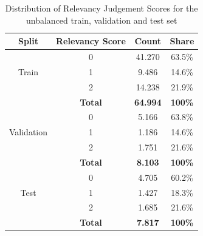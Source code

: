 \documentclass[sigconf, natbib=true]{acmart}
\begin{document}
\begin{table}[]
\caption{Distribution of Relevancy Judgement Scores for the unbalanced train, validation and test set}
\label{tab:train_val_test_spilt}
\begin{tabular}{c c c c}
\hline
\textbf{Split}                       & \textbf{Relevancy Score} & \textbf{Count} & \textbf{Share} \\ \hline
\multirow{3}{*}{Train}      & 0               & 41.270 & 63.5\%  \\ \cline{2-4} 
                            & 1               & 9.486  & 14.6\%  \\ \cline{2-4} 
                            & 2               & 14.238 & 21.9\%  \\ \cline{2-4} 
                       & \textbf{Total}               & \textbf{64.994} & \textbf{100\%}   \\ \hline
\multirow{3}{*}{Validation} & 0               & 5.166  & 63.8\%  \\ \cline{2-4} 
                            & 1               & 1.186  & 14.6\%  \\ \cline{2-4} 
                            & 2               & 1.751  & 21.6\%  \\ \cline{2-4} 
                       & \textbf{Total}               & \textbf{8.103}  & \textbf{100\%}   \\ \hline
\multirow{3}{*}{Test}       & 0               & 4.705  & 60.2\%  \\ \cline{2-4} 
                            & 1               & 1.427  & 18.3\%  \\ \cline{2-4} 
                            & 2               & 1.685  & 21.6\%  \\ \cline{2-4} 
                       & \textbf{Total}               & \textbf{7.817}  & \textbf{100\%}   \\ \hline
\end{tabular}
\end{table}
\end{document}
